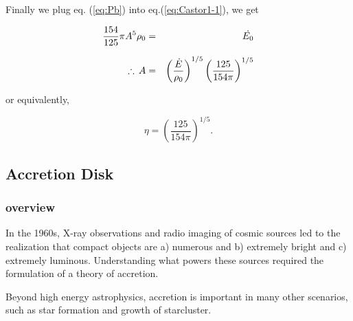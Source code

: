 Finally we plug eq. (\ref{eq:Pb}) into eq.(\ref{eq:Castor1-1}), we get

\begin{eqnarray}
   \frac{154}{125} \pi A^{5} \rho_{0} &=& \dot{E_{0}}  \nonumnext
   \therefore \, A &=& \left( \frac{\dot{E}}{\rho_{0}} \right)^{1/5} \left( \frac{125}{154 \pi} \right)^{1/5}
\end{eqnarray}

\noi or equivalently,

\begin{equation}\label{eq:eta}
   \eta = \left( \frac{125}{154 \pi} \right)^{1/5}.
\end{equation}

\bigskip
\subsection{Accretion Disk}
\subsubsection{overview}
In the 1960s, X-ray observations and radio imaging of cosmic sources led to the realization 
that compact objects are a) numerous and b) extremely bright and c) extremely luminous. Understanding
what powers these sources required the formulation of a theory of accretion.

Beyond  high energy astrophysics, accretion is important in many other scenarios, such as star formation
and growth of starcluster.


